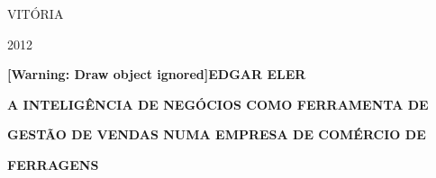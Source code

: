 \documentclass[a4paper]{article}
\begin{document}
\bigskip


\bigskip


\bigskip


\bigskip


\bigskip


\bigskip


\bigskip


\bigskip


\bigskip

{\centering{}\sffamily
VIT\'ORIA
\par}

{\centering{}
\textsf{2012}
\par}

\clearpage\setcounter{page}{1}\pagestyle{Converti}
{\centering{}\sffamily\bfseries
[Warning: Draw object ignored]EDGAR ELER
\par}


\bigskip


\bigskip


\bigskip


\bigskip


\bigskip


\bigskip


\bigskip


\bigskip


\bigskip


\bigskip


\bigskip


\bigskip


\bigskip


\bigskip


\bigskip


\bigskip

{\centering{}\sffamily\bfseries
A INTELIG\^ENCIA DE NEG\'OCIOS COMO FERRAMENTA DE
\par}

{\centering{}\sffamily\bfseries
GEST\~AO DE VENDAS NUMA EMPRESA DE COM\'ERCIO DE
\par}

{\centering{}\sffamily\bfseries
FERRAGENS
\par}


\bigskip


\bigskip


\bigskip


\bigskip


\bigskip


\bigskip
\end{document}
